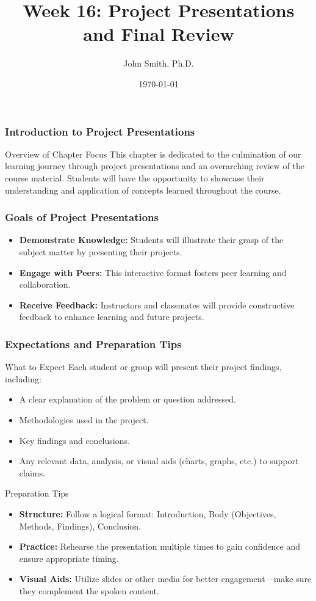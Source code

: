 \documentclass[aspectratio=169]{beamer}
\title[Week 16: Project Presentations and Final Review]{Week 16: Project Presentations and Final Review}
\author[J. Smith]{John Smith, Ph.D.}
\institute[University Name]{
  Department of Computer Science\\
  University Name\\
  \vspace{0.3cm}
  Email: email@university.edu\\
  Website: www.university.edu
}
\date{\today}
\begin{document}
\frame{\titlepage}

\begin{frame}[fragile]
    \frametitle{Introduction to Project Presentations}
    \begin{block}{Overview of Chapter Focus}
        This chapter is dedicated to the culmination of our learning journey through project presentations and an overarching review of the course material.
        Students will have the opportunity to showcase their understanding and application of concepts learned throughout the course.
    \end{block}
\end{frame}

\begin{frame}[fragile]
    \frametitle{Goals of Project Presentations}
    \begin{itemize}
        \item \textbf{Demonstrate Knowledge:} Students will illustrate their grasp of the subject matter by presenting their projects.
        \item \textbf{Engage with Peers:} This interactive format fosters peer learning and collaboration.
        \item \textbf{Receive Feedback:} Instructors and classmates will provide constructive feedback to enhance learning and future projects.
    \end{itemize}
\end{frame}

\begin{frame}[fragile]
    \frametitle{Expectations and Preparation Tips}
    \begin{block}{What to Expect}
        Each student or group will present their project findings, including:
        \begin{itemize}
            \item A clear explanation of the problem or question addressed.
            \item Methodologies used in the project.
            \item Key findings and conclusions.
            \item Any relevant data, analysis, or visual aids (charts, graphs, etc.) to support claims.
        \end{itemize}
    \end{block}
    
    \begin{block}{Preparation Tips}
        \begin{itemize}
            \item \textbf{Structure:} Follow a logical format: Introduction, Body (Objectives, Methods, Findings), Conclusion.
            \item \textbf{Practice:} Rehearse the presentation multiple times to gain confidence and ensure appropriate timing.
            \item \textbf{Visual Aids:} Utilize slides or other media for better engagement—make sure they complement the spoken content.
        \end{itemize}
    \end{block}
\end{frame}
\end{document}
